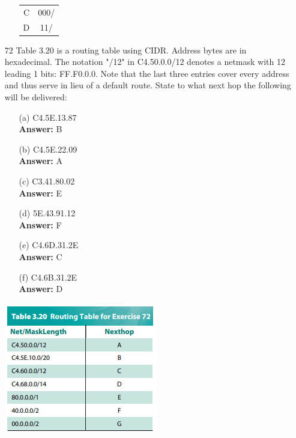 \documentclass[a4paper]{article}
\begin{document}
\begin{itemize}
\begin{itemize}
\begin{tabular}{c c}
	      	      	C & 000/ \\
	      	      	D & 11/  \\
	      	      \end{tabular}
	      \end{itemize}
	\item[72] Table 3.20 is a routing table using CIDR. Address bytes are in hexadecimal. The notation "/12" in C4.50.0.0/12 denotes a netmask with 12 leading 1 bits: FF.F0.0.0. Note that the last three entries cover every address and thus serve in lieu of a default route. State to what next hop the following will be delivered:
	      \begin{itemize}
	      	\item[(a)] C4.5E.13.87 \\
	      	      \textbf{Answer:} B
	      	\item[(b)] C4.5E.22.09 \\
	      	      \textbf{Answer:} A
	      	\item[(c)] C3.41.80.02 \\
	      	      \textbf{Answer:} E
	      	\item[(d)] 5E.43.91.12 \\
	      	      \textbf{Answer:} F
	      	\item[(e)] C4.6D.31.2E \\
	      	      \textbf{Answer:} C
	      	\item[(f)] C4.6B.31.2E \\
	      	      \textbf{Answer:} D
	      \end{itemize}  
	      \includegraphics{3-72.png}  
\end{itemize}
\end{document}
